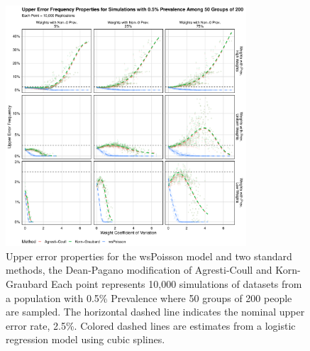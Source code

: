 \documentclass[AMA,STIX1COL]{WileyNJD-v2}
\begin{document}
\begin{figure}
\centering
\includegraphics[width=0.8\textwidth]{figures/perfect_upper_error_frequency_50_groups_0_005_prev.pdf}
\caption{Upper error properties for the wsPoisson model and two standard methods, the Dean-Pagano modification of Agresti-Coull and Korn-Graubard
Each point represents 10,000 simulations of datasets from a population with 0.5\% Prevalence where 50 groups of 200 people are sampled.
The horizontal dashed line indicates the nominal upper error rate, 2.5\%.
Colored dashed lines are estimates from a logistic regression model using cubic splines.}
\label{fig:perfect_upper_error_frequency_50_groups_0_005_prev}
\end{figure}
\end{document}
